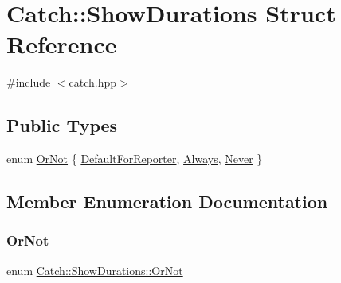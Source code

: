 \hypertarget{struct_catch_1_1_show_durations}{}\section{Catch\+::Show\+Durations Struct Reference}
\label{struct_catch_1_1_show_durations}


{\ttfamily \#include $<$catch.\+hpp$>$}

\subsection*{Public Types}
\begin{DoxyCompactItemize}
\item 
enum \mbox{\hyperlink{struct_catch_1_1_show_durations_a82fa0174554187220c1eda175f122ee1}{Or\+Not}} \{ \mbox{\hyperlink{struct_catch_1_1_show_durations_a82fa0174554187220c1eda175f122ee1aba1710583107b0736c1f5f0f8dfd23c8}{Default\+For\+Reporter}}, 
\mbox{\hyperlink{struct_catch_1_1_show_durations_a82fa0174554187220c1eda175f122ee1ab49682ccb55f2d6b4dfcdb027c09da9a}{Always}}, 
\mbox{\hyperlink{struct_catch_1_1_show_durations_a82fa0174554187220c1eda175f122ee1af1a716bc46185f561382a12a0dede9f3}{Never}}
 \}
\end{DoxyCompactItemize}


\subsection{Member Enumeration Documentation}
\mbox{\label{struct_catch_1_1_show_durations_a82fa0174554187220c1eda175f122ee1}} 
\subsubsection{\texorpdfstring{OrNot}{OrNot}}
{\footnotesize\ttfamily enum \mbox{\hyperlink{struct_catch_1_1_show_durations_a82fa0174554187220c1eda175f122ee1}{Catch\+::\+Show\+Durations\+::\+Or\+Not}}}

